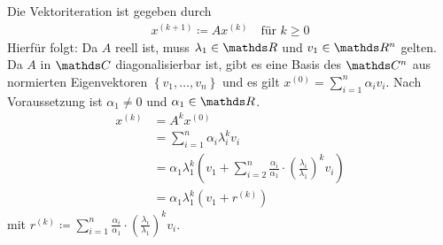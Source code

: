 \label{8.2.2}
Die Vektoriteration ist gegeben durch
\begin{gather}
  x^{(k+1)} \coloneqq Ax^{(k)} \quad \text{für } k\geq 0
  \label{VIII.2.1}
\end{gather}
Hierfür folgt:
Da $A$ reell ist, muss $\lambda_1\in \R$ und $v_1\in\R^n$ gelten.
Da $A$ in $\C$ diagonalisierbar ist,
gibt es eine Basis des $\C^n$ aus
normierten Eigenvektoren $\left\{v_1,\dotsc,v_n\right\}$
und es gilt $x^{(0)}= \sum_{i=1}^{n} \alpha_iv_i$.
Nach Voraussetzung ist $\alpha_1\neq 0$ und $\alpha_1\in\R$.
\begin{align}\nonumber
  x^{(k)} &= A^kx^{(0)} \\\nonumber
          &= \sum_{i=1}^{n} \alpha_i\lambda_i^kv_i\\\nonumber
          &= \alpha_1\lambda_1^k\left(
            v_1+\sum_{i=2}^{n}\frac{\alpha_i}{\alpha_1}
            \cdot \left(\frac{\lambda_i}{\lambda_1}\right)^kv_i
            \right)\\
          &= \alpha_1\lambda_1^k\left( v_1+r^{(k)}  \right)
            \label{VIII.2.2}
\end{align}
mit $r^{(k)}\coloneqq \sum_{i=1}^{n}\frac{\alpha_i}{\alpha_1}
\cdot \left(\frac{\lambda_i}{\lambda_1}\right)^kv_i$.

